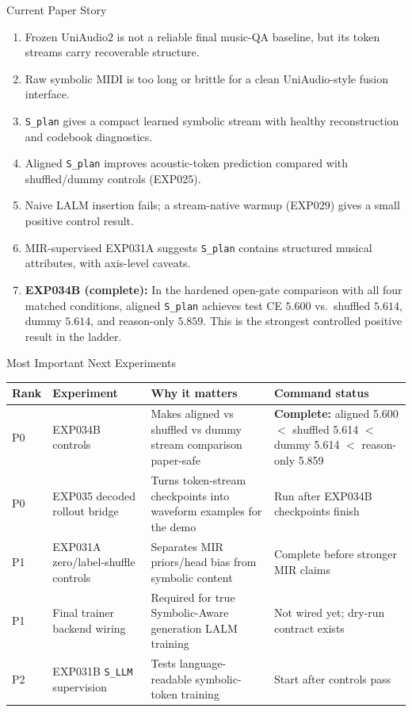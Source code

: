 \documentclass[aspectratio=169,11pt]{beamer}
\newcommand{\code}[1]{\texttt{\footnotesize #1}}
\begin{document}
\begin{frame}{Current Paper Story}
  \footnotesize
  \begin{enumerate}
    \item Frozen UniAudio2 is not a reliable final music-QA baseline, but its token streams carry recoverable structure.
    \item Raw symbolic MIDI is too long or brittle for a clean UniAudio-style fusion interface.
    \item \code{S\_plan} gives a compact learned symbolic stream with healthy reconstruction and codebook diagnostics.
    \item Aligned \code{S\_plan} improves acoustic-token prediction compared with shuffled/dummy controls (EXP025).
    \item Naive LALM insertion fails; a stream-native warmup (EXP029) gives a small positive control result.
    \item MIR-supervised EXP031A suggests \code{S\_plan} contains structured musical attributes, with axis-level caveats.
    \item \textbf{EXP034B (complete):} In the hardened open-gate comparison with all four matched conditions, aligned \code{S\_plan} achieves test CE $5.600$ vs.\ shuffled $5.614$, dummy $5.614$, and reason-only $5.859$. This is the strongest controlled positive result in the ladder.
  \end{enumerate}
\end{frame}

\begin{frame}{Most Important Next Experiments}
  \scriptsize
  \begin{tabularx}{\linewidth}{p{1.2cm}p{3.3cm}Yp{3.3cm}}
    \toprule
    Rank & Experiment & Why it matters & Command status \\
    \midrule
    P0 & EXP034B controls & Makes aligned vs shuffled vs dummy stream comparison paper-safe & \textbf{Complete:} aligned 5.600 $<$ shuffled 5.614 $<$ dummy 5.614 $<$ reason-only 5.859 \\
    P0 & EXP035 decoded rollout bridge & Turns token-stream checkpoints into waveform examples for the demo & Run after EXP034B checkpoints finish \\
    P1 & EXP031A zero/label-shuffle controls & Separates MIR priors/head bias from symbolic content & Complete before stronger MIR claims \\
    P1 & Final trainer backend wiring & Required for true Symbolic-Aware generation LALM training & Not wired yet; dry-run contract exists \\
    P2 & EXP031B \code{S\_LLM} supervision & Tests language-readable symbolic-token training & Start after controls pass \\
    \bottomrule
  \end{tabularx}
\end{frame}
\end{document}
